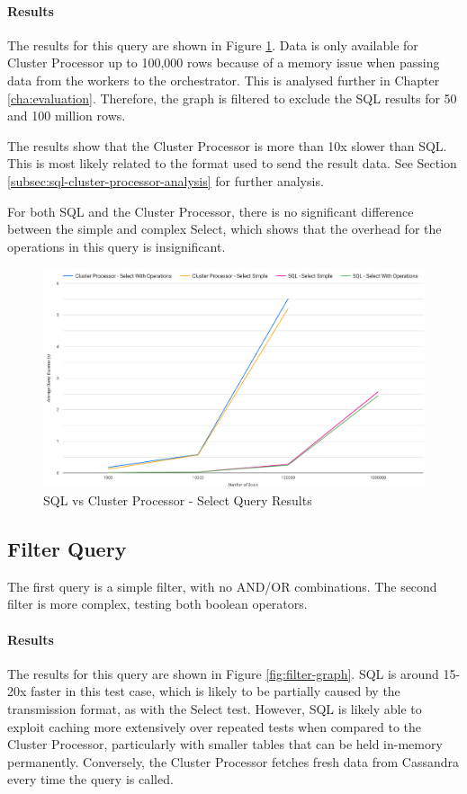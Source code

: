 \paragraph{Results} The results for this query are shown in Figure \ref{fig:select-graph}. Data is only available for Cluster Processor up to 100,000 rows because of a memory issue when passing data from the workers to the orchestrator. This is analysed further in Chapter \ref{cha:evaluation}. Therefore, the graph is filtered to exclude the SQL results for 50 and 100 million rows.

The results show that the Cluster Processor is more than 10x slower than SQL. This is most likely related to the format used to send the result data. See Section \ref{subsec:sql-cluster-processor-analysis} for further analysis. 

For both SQL and the Cluster Processor, there is no significant difference between the simple and complex Select, which shows that the overhead for the operations in this query is insignificant.

\begin{figure}[htp]
	\centering
	\includegraphics[width=0.8\linewidth]{chapters/diagrams/testing/select-simple-1k-1m}
	\caption{SQL vs Cluster Processor - Select Query Results}
	\label{fig:select-graph}
\end{figure}

\pagebreak
\subsection{Filter Query}
The first query is a simple filter, with no AND/OR combinations. 
The second filter is more complex, testing both boolean operators. 

\paragraph{Results}
The results for this query are shown in Figure \ref{fig:filter-graph}. SQL is around 15-20x faster in this test case, which is likely to be partially caused by the transmission format, as with the Select test. However, SQL is likely able to exploit caching more extensively over repeated tests when compared to the Cluster Processor, particularly with smaller tables that can be held in-memory permanently. Conversely, the Cluster Processor fetches fresh data from Cassandra every time the query is called.


